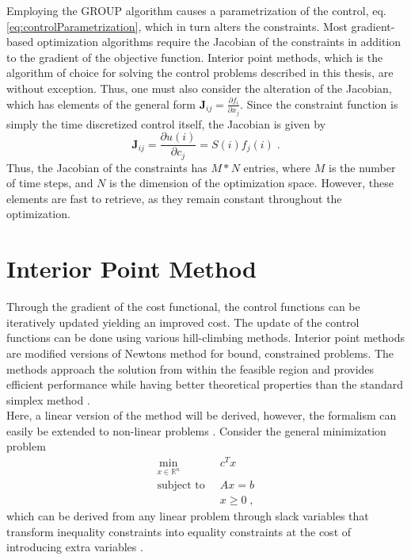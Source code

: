Employing the GROUP algorithm causes a parametrization of the control, eq. \eqref{eq:controlParametrization}, which in turn alters the constraints. Most gradient-based optimization algorithms require the Jacobian of the constraints in addition to the gradient of the objective function. Interior point methods, which is the algorithm of choice for solving the control problems described in this thesis, are without exception. Thus, one must also consider the alteration of the Jacobian, which has elements of the general form $\boldsymbol{J}_{ij} = \frac{\partial f_i}{\partial x_j}$.
Since the constraint function is simply the time discretized control itself, the Jacobian is given by
\begin{equation}
	\boldsymbol{J}_{ij} = \frac{\partial u(i)}{\partial c_j} = S(i) f_j (i) \; .
\end{equation}
Thus, the Jacobian of the constraints has $M * N$ entries, where $M$ is the number of time steps, and $N$ is the dimension of the optimization space. However, these elements are fast to retrieve, as they remain constant throughout the optimization. 


\section{Interior Point Method} \label{sec:IntPoint}
Through the gradient of the cost functional, the control functions can be iteratively updated yielding an improved cost. The update of the control functions can be done using various hill-climbing methods.
Interior point methods are modified versions of Newtons method for bound, constrained problems. The methods approach the solution from within the feasible region and provides efficient performance while having better theoretical properties than the standard simplex method \cite{wright}.\\

Here, a linear version of the method will be derived, however, the formalism can easily be extended to non-linear problems \cite{wright}.
Consider the general minimization problem
 \begin{align*}
	\min_{x \in \mathbb{R}^n} \;  & \; c^T x \\
	\text{subject to} \;  & \; A x = b  \\
							& \; x \geq 0 \; ,
\end{align*}
which can be derived from any linear problem through slack variables that transform inequality constraints into equality constraints at the cost of introducing extra variables \cite{ipopt}.

